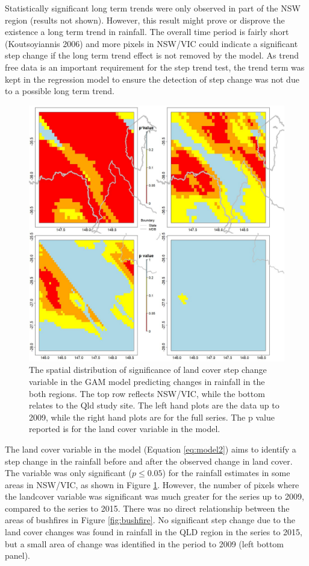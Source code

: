 \documentclass[]{elsarticle} %
\theoremstyle{definition}
\theoremstyle{definition}
\theoremstyle{definition}
\theoremstyle{remark}
\begin{document}
Statistically significant long term trends were only observed in part of
the NSW region (results not shown). However, this result might prove or
disprove the existence a long term trend in rainfall. The overall time
period is fairly short (Koutsoyiannis 2006) and more pixels in NSW/VIC
could indicate a significant step change if the long term trend effect
is not removed by the model. As trend free data is an important
requirement for the step trend test, the trend term was kept in the
regression model to ensure the detection of step change was not due to a
possible long term trend.

\begin{figure}
\includegraphics[width=0.9\linewidth]{figures/Cp_30yrs} \caption{The spatial distribution of significance of land cover step change variable in the GAM model predicting changes in rainfall in the both regions. The top row reflects NSW/VIC, while the bottom relates to the Qld study site. The left hand plots are the data up to 2009, while the right hand plots are for the full series. The p value reported is for the land cover variable in the model.}\label{fig:LCp}
\end{figure}

The land cover variable in the model (Equation \eqref{eq:model2}) aims to
identify a step change in the rainfall before and after the observed
change in land cover. The variable was only significant
(\(p \leq 0.05\)) for the rainfall estimates in some areas in NSW/VIC,
as shown in Figure \ref{fig:LCp}. However, the number of pixels where
the landcover variable was significant was much greater for the series
up to 2009, compared to the series to 2015. There was no direct
relationship between the areas of bushfires in Figure
\ref{fig:bushfire}. No significant step change due to the land cover
changes was found in rainfall in the QLD region in the series to 2015,
but a small area of change was identified in the period to 2009 (left
bottom panel).
\end{document}
